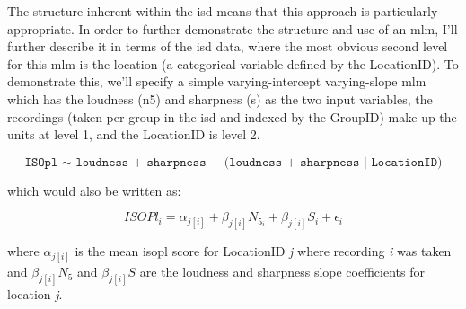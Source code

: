 The structure inherent within the \gls{isd} means that this approach is particularly appropriate. In order to further demonstrate the structure and use of an \gls{mlm}, I'll further describe it in terms of the \gls{isd} data, where the most obvious second level for this \gls{mlm} is the location (a categorical variable defined by the LocationID). To demonstrate this, we'll specify a simple varying-intercept varying-slope \gls{mlm} which has the loudness (\gls{n5}) and sharpness (\gls{s}) as the two input variables, the recordings (taken per group in the \gls{isd} and indexed by the GroupID) make up the units at level 1, and the LocationID is level 2. 

\begin{equation}
  \label{eqn:basicISDMLM}
  \texttt{ISOpl $\sim$ loudness + sharpness + (loudness + sharpness | LocationID)}
\end{equation}

which would also be written as:

\begin{equation}
  ISOPl_i = \alpha_{j[i]} + \beta_{j[i]}N_{5_i} + \beta_{j[i]}S_i + \epsilon_i
\end{equation}

where $\alpha_{j[i]}$ is the mean \gls{isopl} score for LocationID \emph{j} where recording \emph{i} was taken and $\beta_{j[i]}N_5$ and $\beta_{j[i]}S$ are the loudness and sharpness slope coefficients for location \emph{j}. 

